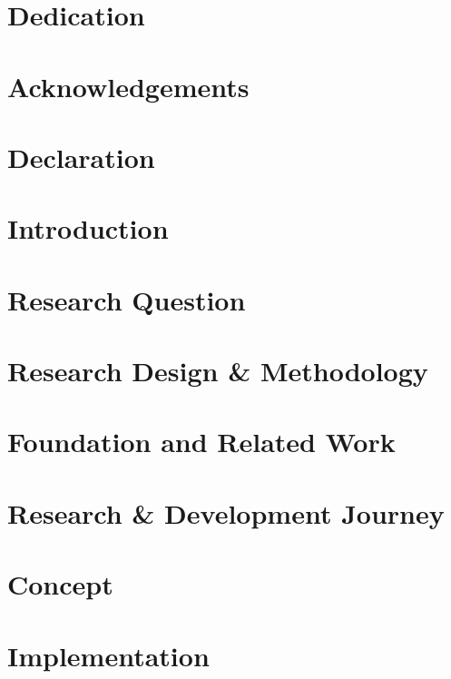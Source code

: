 \documentclass[a4paper,12pt]{report}
\begin{document}



\chapter*{Dedication}

\chapter*{Acknowledgements}

\chapter*{Declaration}


\tableofcontents
\listoffigures
\listoftables

\chapter{Introduction}

\chapter{Research Question}

\chapter{Research Design \& Methodology}

\chapter{Foundation and Related Work}

\chapter{Research \& Development Journey}

\chapter{Concept}

\chapter{Implementation}

\end{document}
